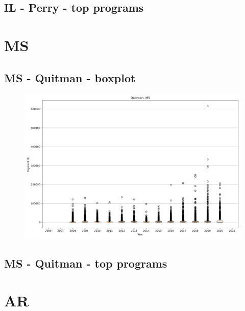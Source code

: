 \subsection*{IL - Perry - top programs}

\newpage
\section*{MS}
\subsection*{MS - Quitman - boxplot}
\begin{figure}[h]
\centering
\includegraphics[width=7in]{../output/boxplots/counties/Quitman-MS_boxplot.png}
\end{figure}


\subsection*{MS - Quitman - top programs}

\newpage
\section*{AR}
